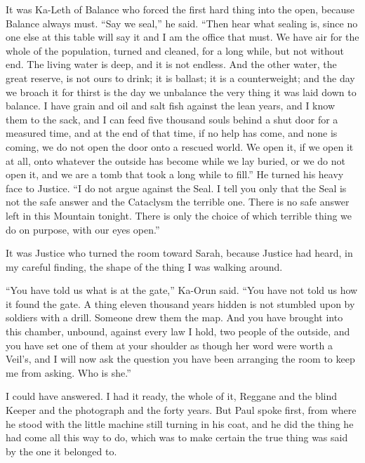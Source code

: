 It was Ka-Leth of Balance who forced the first hard thing into the open, because Balance always must. ``Say we seal,'' he said. ``Then hear what sealing is, since no one else at this table will say it and I am the office that must. We have air for the whole of the population, turned and cleaned, for a long while, but not without end. The living water is deep, and it is not endless. And the other water, the great reserve, is not ours to drink; it is ballast; it is a counterweight; and the day we broach it for thirst is the day we unbalance the very thing it was laid down to balance. I have grain and oil and salt fish against the lean years, and I know them to the sack, and I can feed five thousand souls behind a shut door for a measured time, and at the end of that time, if no help has come, and none is coming, we do not open the door onto a rescued world. We open it, if we open it at all, onto whatever the outside has become while we lay buried, or we do not open it, and we are a tomb that took a long while to fill.'' He turned his heavy face to Justice. ``I do not argue against the Seal. I tell you only that the Seal is not the safe answer and the Cataclysm the terrible one. There is no safe answer left in this Mountain tonight. There is only the choice of which terrible thing we do on purpose, with our eyes open.''\par

\ornament

It was Justice who turned the room toward Sarah, because Justice had heard, in my careful finding, the shape of the thing I was walking around.\par

``You have told us what is at the gate,'' Ka-Orun said. ``You have not told us how it found the gate. A thing eleven thousand years hidden is not stumbled upon by soldiers with a drill. Someone drew them the map. And you have brought into this chamber, unbound, against every law I hold, two people of the outside, and you have set one of them at your shoulder as though her word were worth a Veil's, and I will now ask the question you have been arranging the room to keep me from asking. Who is she.''\par

I could have answered. I had it ready, the whole of it, Reggane and the blind Keeper and the photograph and the forty years. But Paul spoke first, from where he stood with the little machine still turning in his coat, and he did the thing he had come all this way to do, which was to make certain the true thing was said by the one it belonged to.\par

